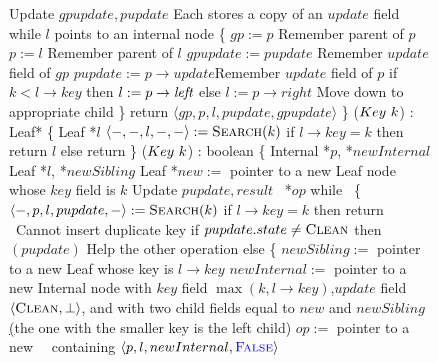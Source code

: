 \begin{figure*}
\begin{code}
		Update $gpupdate, pupdate$ \tabtabcom Each stores a copy of an $update$ field\bl\nlc
		while $l$ points to an internal node \{ \nlc%
		\n         $gp := p$ \tabtabcom Remember parent of $p$\nlc
		$p := l$ \tabtabcom Remember parent of $l$\nlc
		$gpupdate := pupdate$ \tabtabcom Remember $update$ field of $gp$\nlc
		$pupdate := p\rightarrow update$\label{store-pupdate}\tabtabcom Remember $update$ field of $p$\nlc  
		if $k < l\rightarrow key$ then $l:= p\rightarrow \mbox{\it left}$ else $l:=p \rightarrow right$ \label{read-child}\tabtabcom Move down to appropriate child\nlc
		\p \} \nlc
		return $\langle gp, p, l, pupdate, gpupdate \rangle$ \nlc
		\p 
		\}\bl
		\nlc
		($Key\ k$) : Leaf* \{ \nlc
		\n   Leaf *$l$\bl
		\nlc
		$\langle -,-,l,-,-\rangle := \mbox{\sc Search}(k)$\nlc
		if $l\rightarrow key = k$ then return $l$\nlc
		else return \NULL\nlc
		\p
		\}\bl
		\nlc
		($Key\ k$) : boolean \{ \nlc
		\n Internal *$p$, *$newInternal$\nlc 
		Leaf *$l$, *$newSibling$\nlc 
		Leaf *$new :=$ pointer to a new Leaf node whose $key$ field is $k$  \nlc
		Update $pupdate, result$\nlc
		\IFlag\ *$op$\bl\nlc%
		while \TRUE\ \{  \nlc
		\n $\langle -, p, l, pupdate, - \rangle := \mbox{\sc Search}(k)$ \label{ins-search}\nlc
		if $l \rightarrow key = k$ then return \FALSE\ \tabtabcom Cannot insert duplicate key\label{insert-false}\nlc
		if $pupdate.state \neq \mbox{\sc Clean}$ then $(pupdate)$ \tabtabcom Help the other operation \label{ins-help-unclean}\nlc
		else \{\nlc
		\n        $newSibling :=$ pointer to a new Leaf whose key is $l\rightarrow key$\nlc
		$newInternal :=$ pointer to a new Internal node with $key$ field $\max(k, l \rightarrow key)$,\label{create-internal}\ul      
		\n      $update$ field $\langle \mbox{\sc Clean}, \mbox{$\bot$}\rangle$, and with two
		child fields equal to $new$ and $newSibling$\ul 
		(the one with the smaller key is the left child)\nlc
		\p        $op :=$ pointer to a new \IFlag\ \record\  containing $\langle p, l, newInternal, \textcolor{blue}{\mbox{\sc False}}\rangle$\label{new-IFlag}\nlc

\end{code}
\end{figure*}
